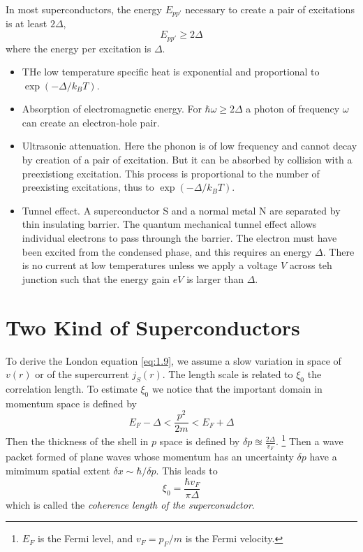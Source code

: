 In most superconductors, the energy $E_{pp'}$ necessary to create a pair of excitations is at least $2\Delta$,
\begin{equation}
 E_{pp'} \geq 2\Delta
 \label{eq:1.17}
\end{equation}
where the energy per excitation is $\Delta$.
\begin{itemize}
 \item THe low temperature specific heat is exponential and proportional to $\exp(-\Delta/k_B T)$.
 \item Absorption of electromagnetic energy.
 For $\hbar \omega \geq 2\Delta$ a photon of frequency $\omega$ can create an electron-hole pair.
 \item Ultrasonic attenuation. Here the phonon is of low frequency and cannot decay by creation of a pair of excitation. But it can be absorbed by collision with a preexistiong excitation. This process is proportional to the number of preexisting excitations, thus to $\exp(-\Delta/k_B T) $.
 \item Tunnel effect. A superconductor S and a normal metal N are separated by thin insulating barrier.
 The quantum mechanical tunnel effect allows individual electrons to pass throungh the barrier.
 The electron must have been excited from the condensed phase, and this requires an energy $\Delta$.
 There is no current at low temperatures unless we apply a voltage $V$ across teh junction such that the energy gain $eV$ is larger than $\Delta$.
\end{itemize}


\section{Two Kind of Superconductors}\label{sec:1.4}
To derive the London equation \eqref{eq:1.9}, we assume a slow variation in space of $v(r)$ or of the supercurrent $j_S(r)$.
The length scale is related to $\xi_0$ the correlation length.
To estimate $\xi_0$ we notice that the important domain in momentum space is defined by
\begin{equation}
 E_F - \Delta < \frac{p^2}{2m} < E_F + \Delta
 \label{eq:1.18}
\end{equation}
Then the thickness of the shell in $p$ space is defined by $\delta p \approxeq \frac{2\Delta}{v_F}$. \footnote{$E_F$ is the Fermi level, and $v_F= p_F/m$ is the Fermi velocity.}
Then a wave packet formed of plane waves whose momentum has an uncertainty $\delta p$ have a mimimum spatial extent $\delta x \sim \hbar/\delta p$.
This leads to
\begin{equation}
 \xi_0 = \frac{\hbar v_F}{\pi \Delta}
 \label{eq:1.19}
\end{equation}
which is called the \textit{coherence length of the superconudctor}.


